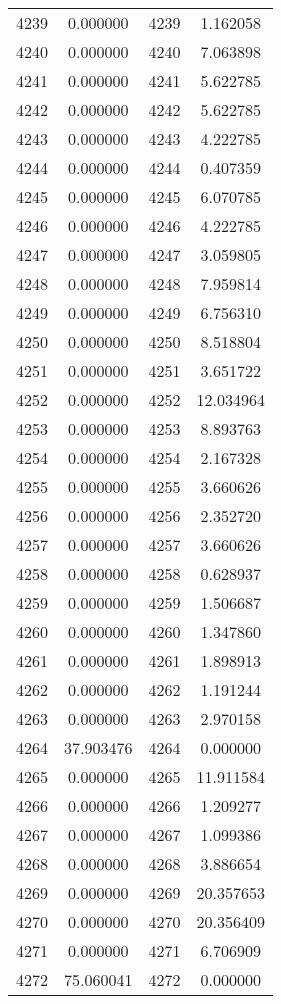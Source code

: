 \documentclass[12pt]{article}
\begin{document}
\begin{longtable}{@{}cccc@{}}
4239 & 0.000000 & 4239 & 1.162058 \\
4240 & 0.000000 & 4240 & 7.063898 \\
4241 & 0.000000 & 4241 & 5.622785 \\
4242 & 0.000000 & 4242 & 5.622785 \\
4243 & 0.000000 & 4243 & 4.222785 \\
4244 & 0.000000 & 4244 & 0.407359 \\
4245 & 0.000000 & 4245 & 6.070785 \\
4246 & 0.000000 & 4246 & 4.222785 \\
4247 & 0.000000 & 4247 & 3.059805 \\
4248 & 0.000000 & 4248 & 7.959814 \\
4249 & 0.000000 & 4249 & 6.756310 \\
4250 & 0.000000 & 4250 & 8.518804 \\
4251 & 0.000000 & 4251 & 3.651722 \\
4252 & 0.000000 & 4252 & 12.034964 \\
4253 & 0.000000 & 4253 & 8.893763 \\
4254 & 0.000000 & 4254 & 2.167328 \\
4255 & 0.000000 & 4255 & 3.660626 \\
4256 & 0.000000 & 4256 & 2.352720 \\
4257 & 0.000000 & 4257 & 3.660626 \\
4258 & 0.000000 & 4258 & 0.628937 \\
4259 & 0.000000 & 4259 & 1.506687 \\
4260 & 0.000000 & 4260 & 1.347860 \\
4261 & 0.000000 & 4261 & 1.898913 \\
4262 & 0.000000 & 4262 & 1.191244 \\
4263 & 0.000000 & 4263 & 2.970158 \\
4264 & 37.903476 & 4264 & 0.000000 \\
4265 & 0.000000 & 4265 & 11.911584 \\
4266 & 0.000000 & 4266 & 1.209277 \\
4267 & 0.000000 & 4267 & 1.099386 \\
4268 & 0.000000 & 4268 & 3.886654 \\
4269 & 0.000000 & 4269 & 20.357653 \\
4270 & 0.000000 & 4270 & 20.356409 \\
4271 & 0.000000 & 4271 & 6.706909 \\
4272 & 75.060041 & 4272 & 0.000000 \\

\end{longtable}
\end{document}
